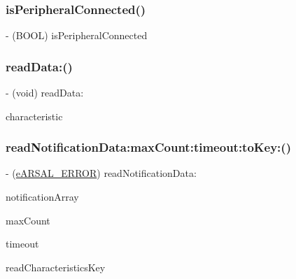 \hypertarget{interfaceARSAL__BLEManager_a456d597ceee1eb99c23ce9f8fe0b7fc1}{}\label{interfaceARSAL__BLEManager_a456d597ceee1eb99c23ce9f8fe0b7fc1} 
\subsubsection{\texorpdfstring{is\+Peripheral\+Connected()}{isPeripheralConnected()}}
{\footnotesize\ttfamily -\/ (B\+O\+OL) is\+Peripheral\+Connected \begin{DoxyParamCaption}{ }\end{DoxyParamCaption}}

\hypertarget{interfaceARSAL__BLEManager_aec8afef362675fb59e03aa2b81c39141}{}\label{interfaceARSAL__BLEManager_aec8afef362675fb59e03aa2b81c39141} 
\subsubsection{\texorpdfstring{read\+Data\+:()}{readData:()}}
{\footnotesize\ttfamily -\/ (void) read\+Data\+: \begin{DoxyParamCaption}\item[{(C\+B\+Characteristic $\ast$)}]{characteristic }\end{DoxyParamCaption}}

\hypertarget{interfaceARSAL__BLEManager_a631ffa16a79854a57ebf744509038859}{}\label{interfaceARSAL__BLEManager_a631ffa16a79854a57ebf744509038859} 
\subsubsection{\texorpdfstring{read\+Notification\+Data\+:max\+Count\+:timeout\+:to\+Key\+:()}{readNotificationData:maxCount:timeout:toKey:()}}
{\footnotesize\ttfamily -\/ (\hyperlink{ARSAL__Error_8h_a95978608019620b9d7e573ad874e5889}{e\+A\+R\+S\+A\+L\+\_\+\+E\+R\+R\+OR}) read\+Notification\+Data\+: \begin{DoxyParamCaption}\item[{(N\+S\+Mutable\+Array $\ast$)}]{notification\+Array }\item[{maxCount:(int)}]{max\+Count }\item[{timeout:(N\+S\+Number $\ast$)}]{timeout }\item[{toKey:(N\+S\+String $\ast$)}]{read\+Characteristics\+Key }\end{DoxyParamCaption}}

